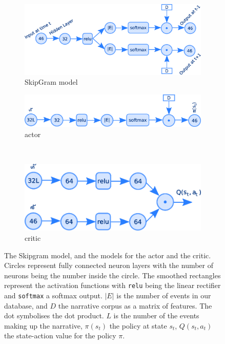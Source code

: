 \documentclass[11pt,letterpaper]{article}
\begin{document}
\begin{figure}[h!]
    \centering
    \begin{subfigure}[b]{0.4\textwidth}
        \includegraphics[width=\textwidth]{softmax}
        \caption{\small SkipGram model}
        \label{figure:model_skipgram}
    \end{subfigure}    
    \begin{subfigure}[b]{0.35\textwidth}
        \includegraphics[width=\textwidth]{actor}
        \caption{\small actor}
        \label{figure:model_actor}
    \end{subfigure}
    ~ %
    \begin{subfigure}[b]{0.35\textwidth}
        \includegraphics[width=\textwidth]{critic}
        \caption{\small critic}
        \label{figure:model_critic}
    \end{subfigure}
    
    \caption{\small The Skipgram model, and the models for the actor and the critic. Circles represent fully connected neuron layers with the number of neurons being the number inside the circle. The smoothed rectangles represent the activation functions with \texttt{relu} being the linear rectifier and \texttt{softmax} a softmax output. $|E|$ is the number of events in our database, and $D$ the narrative corpus as a matrix of features. The dot symbolises the dot product. $L$ is the number of the events making up the narrative, $\pi(s_t)$ the policy at state $s_t$, $Q(s_t, a_t)$ the state-action value for the policy $\pi$.}
    
\end{figure}
\end{document}
